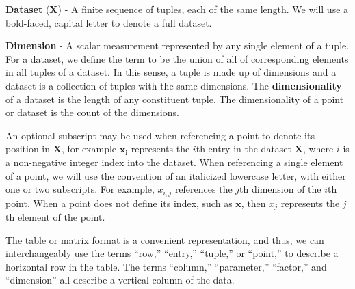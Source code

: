 \begin{defn}
  \textbf{Dataset} ($\mathbf{X}$) - A finite sequence of tuples, each of the same length. We will use a bold-faced, capital letter to denote a full dataset.
\end{defn}

\begin{defn}
  \textbf{Dimension} - A scalar measurement represented by any single element of a tuple. For a dataset, we define the term to be the union of all of corresponding elements in all tuples of a dataset. In this sense, a tuple is made up of dimensions and a dataset is a collection of tuples with the same dimensions. The \textbf{dimensionality} of a dataset is the length of any constituent tuple. The dimensionality of a point or dataset is the count of the dimensions.
\end{defn}

An optional subscript may be used when referencing a point to denote its position in $\mathbf{X}$, for example $\mathbf{x_i}$ represents the $i$th entry in the dataset $\mathbf{X}$, where $i$ is a non-negative integer index into the dataset.
%
When referencing a single element of a point, we will use the convention of an italicized lowercase letter, with either one or two subscripts.
%
For example, $x_{i,j}$ references the $j$th dimension of the $i$th point.
%
When a point does not define its index, such as $\mathbf{x}$, then $x_j$ represents the $j$th element of the point.

The table or matrix format is a convenient representation, and thus, we can interchangeably use the terms ``row,'' ``entry,'' ``tuple,'' or ``point,'' to describe a horizontal row in the table.
%
The terms ``column,'' ``parameter,'' ``factor,'' and ``dimension'' all describe a vertical column of the data.

